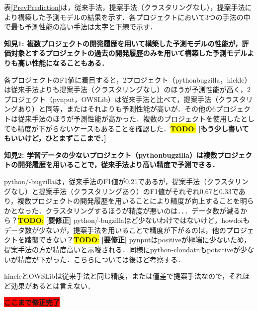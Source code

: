 \documentclass[T,J]{fose} %
\newcommand{\todo}[1]{\colorbox{yellow}{{\bf TODO}:}{\color{red} {\textbf{[#1]}}}}
\begin{document}
表\ref{PrevPrediction}は，従来手法，提案手法（クラスタリングなし），提案手法により構築した予測モデルの結果を示す．各プロジェクトにおいて3つの手法の中で最も予測性能の高い手法は太字と下線で示す．

\noindent\textbf{知見1: 複数プロジェクトの開発履歴を用いて構築した予測モデルの性能が，評価対象とするプロジェクトの過去の開発履歴のみを用いて構築した予測モデルよりも高い性能になることもある．}

各プロジェクトのF1値に着目すると，2プロジェクト（python\-bugzilla，hickle）は従来手法よりも提案手法（クラスタリングなし）のほうが予測性能が高く，2プロジェクト（pynput，OWSLib）は従来手法と比べて，提案手法（クラスタリングあり）と同等，またはそれよりも予測性能が高いが．その他の6プロジェクトは従来手法のほうが予測性能が高かった．複数のプロジェクトを使用したとしても精度が下がらないケースもあることを確認した．\todo{もう少し書いてもいいけど，ひとまずここまで．}

\noindent\textbf{知見2: 学習データの少ないプロジェクト（python\-bugzilla）は複数プロジェクトの開発履歴を用いることで，従来手法より高い精度で予測できる．}

python/-bugzillaは，従来手法のF1値が0.21であるが，提案手法（クラスタリングなし）と提案手法（クラスタリングあり）のF1値がそれぞれ0.67と0.33であり，複数プロジェクトの開発履歴を用いることにより精度が向上することを明らかとなった．クラスタリングするほうが精度が悪いのは．．．データ数が減るから？\todo{要修正}
python/-bugzillaほど少ないわけではないけど，howdoiもデータ数が少ないが，提案手法を用いることで精度が下がるのは，他のプロジェクトを踏襲できない？\todo{要修正}
pynputはpositiveが極端に少ないため，提案手法の方が精度高いと示唆される．同様にpython-cloudatnもpotsitiveが少ないが精度が下がった．こちらについては後ほど考察する．

hincleとOWSLibは従来手法と同じ精度，または僅差で提案手法なので，それほど効果があるとは言えない．

\colorbox{red}{{\bf ここまで修正完了}}


%
%
\end{document}

